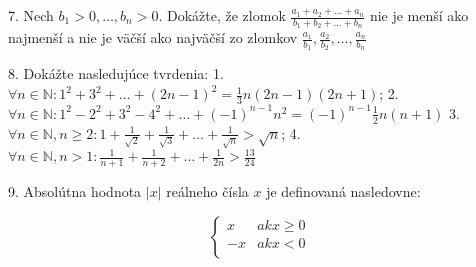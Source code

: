7. Nech $b_1 > 0, \ldots, b_n > 0$. Dokážte, že zlomok $\frac{a_1 + a_2 +
\ldots + a_n}{b_1 + b_2 + \ldots + b_n}$ nie je menší ako najmenší a nie je
väčší ako najväčší zo zlomkov $\frac{a_1}{b_1}, \frac{a_2}{b_2},
\ldots, \frac{a_n}{b_n}$

8. Dokážte nasledujúce tvrdenia:
  1. $\forall n \in \mathbb{N}: 1^2 + 3^2 + \ldots + (2n - 1)^2 = \frac{1}{3} n(2n - 1)(2n + 1)$;
  2. $\forall n \in \mathbb{N}: 1^2 - 2^2 + 3^2 - 4^2 + \ldots + (-1)^{n-1}n^2 = (-1)^{n-1}\frac{1}{2}n(n + 1)$
  3. $\forall n \in \mathbb{N}, n \geq 2: 1 + \frac{1}{\sqrt{2}} + \frac{1}{\sqrt{3}} + \ldots + \frac{1}{\sqrt{n}} > \sqrt{n}$;
  4. $\forall n \in \mathbb{N}, n > 1: \frac{1}{n+1} + \frac{1}{n+2} + \ldots + \frac{1}{2n} > \frac{13}{24}$

9. Absolútna hodnota $|x|$ reálneho čísla $x$ je definovaná nasledovne:

\[   \left\{
\begin{array}{ll}
  x & ak x \geq 0 \\
  -x & ak x < 0 \\
\end{array} 
\right. \]
